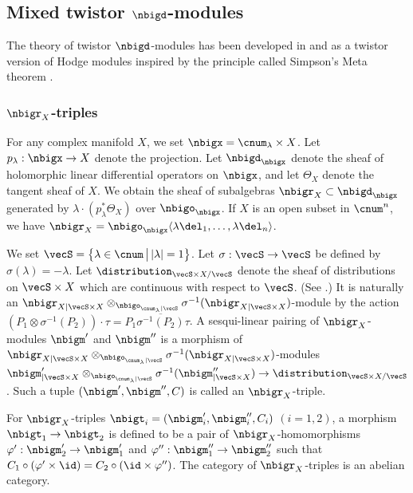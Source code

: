\documentclass[a4,10pt]{article}
\begin{document}
\subsection{Mixed twistor $\nbigd$-modules}

The theory of twistor $\nbigd$-modules
has been developed
in \cite{Sabbah-pure-twistor,Sabbah-wild-twistor}
and \cite{mochi2,Mochizuki-wild,Mochizuki-MTM}
as a twistor version of Hodge modules
\cite{saito1,saito2}
inspired by the principle called Simpson's Meta theorem \cite{s3}.

\subsubsection{$\nbigr_X$-triples}

For any complex manifold $X$,
we set $\nbigx=\cnum_{\lambda}\times X$.
Let $p_{\lambda}:\nbigx\to X$ denote the projection.
Let $\nbigd_{\nbigx}$ denote the sheaf of
holomorphic linear differential operators on $\nbigx$,
and let $\Theta_X$ denote the tangent sheaf of $X$.
We obtain the sheaf of subalgebras 
$\nbigr_X\subset\nbigd_{\nbigx}$
generated by
$\lambda \cdot (p_{\lambda}^{\ast}\Theta_X)$ over $\nbigo_{\nbigx}$.
If $X$ is an open subset in $\cnum^n$,
we have
$\nbigr_X=
\nbigo_{\nbigx}\langle\lambda\del_1,\ldots,\lambda\del_n\rangle$.


We set
$\vecS=\bigl\{\lambda\in\cnum\,\big|\,|\lambda|=1\bigr\}$.
Let $\sigma:\vecS\to\vecS$ be defined by
$\sigma(\lambda)=-\lambda$.
Let $\distribution_{\vecS\times X/\vecS}$
denote the sheaf of distributions
on $\vecS\times X$ which are continuous with respect to $\vecS$.
(See \cite[\S0.5]{Sabbah-pure-twistor}.)
It is naturally
an $\nbigr_{X|\vecS\times X}\otimes_{\nbigo_{\cnum_{\lambda}|\vecS}}
\sigma^{-1}(\nbigr_{X|\vecS\times X})$-module
by the action
$(P_1\otimes\sigma^{-1}(P_2))\cdot \tau
=P_1\overline{\sigma^{-1}(P_2)}\tau$.
A sesqui-linear pairing of $\nbigr_X$-modules $\nbigm'$ and $\nbigm''$
is a morphism of
$\nbigr_{X|\vecS\times X}\otimes_{\nbigo_{\cnum_{\lambda}|\vecS}}
\sigma^{-1}(\nbigr_{X|\vecS\times X})$-modules
$\nbigm'_{|\vecS\times X}\otimes_{\nbigo_{\cnum_{\lambda}|\vecS}}
\sigma^{-1}(\nbigm''_{|\vecS\times X})
\to
\distribution_{\vecS\times X/\vecS}$.
Such a tuple $(\nbigm',\nbigm'',C)$
is called an $\nbigr_X$-triple.

For $\nbigr_X$-triples
$\nbigt_i=(\nbigm_i',\nbigm_i'',C_i)$ $(i=1,2)$,
a morphism 
$\nbigt_1\to\nbigt_2$
is defined to be a pair of $\nbigr_X$-homomorphisms
$\varphi':\nbigm_2'\to\nbigm_1'$
and $\varphi'':\nbigm_1''\to\nbigm_2''$
such that
$C_1\circ (\varphi'\times\id)
=C_2\circ(\id\times\varphi'')$.
The category of $\nbigr_X$-triples
is an abelian category.
\end{document}
